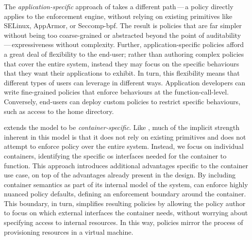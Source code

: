 The \textit{application-specific} approach of \bpfbox{} takes a different path\,---\,a
\bpfbox{} policy directly applies to the \bpfbox{} enforcement engine, without relying on
existing primitives like SELinux, AppArmor, or Seccomp-bpf. The result is policies that
are far simpler without being too coarse-grained or abstracted beyond the point of
auditability\,---\,expressiveness without complexity. Further, application-specific
policies afford a great deal of flexibility to the end-user; rather than authoring complex
policies that cover the entire system, instead they may focus on the specific behaviours
that they want their applications to exhibit. In turn, this flexibility means that
different types of users can leverage \bpfbox{} in different ways.  Application developers
can write fine-grained policies that enforce behaviours at the function-call-level.
Conversely, end-users can deploy custom \bpfbox{} policies to restrict specific
behaviours, such as access to the home directory.

\bpfcontain{} extends the \bpfbox{} model to be \textit{container-specific}. Like
\bpfbox{}, much of the implicit strength inherent in this model is that it does not rely
on existing primitives and does not attempt to enforce policy over the entire system.
Instead, we focus on individual containers, identifying the specific \gls{os} interfaces
needed for the container to function.  This approach introduces additional advantages
specific to the container use case, on top of the advantages already present in the
\bpfbox{} design. By including container semantics as part of its internal model of the
system, \bpfcontain{} can enforce highly nuanced policy defaults, defining an enforcement
boundary around the container. This boundary, in turn, simplifies resulting policies by
allowing the policy author to focus on which external interfaces the container needs,
without worrying about specifying access to internal resources. In this way, \bpfcontain{}
policies mirror the process of provisioning resources in a virtual machine.



